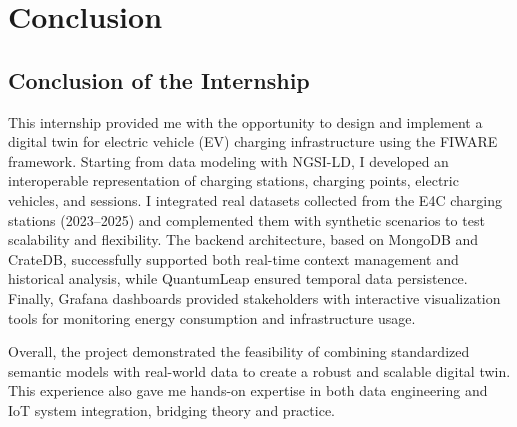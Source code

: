 \chapter{Conclusion}\label{chap7}
\section{Conclusion of the Internship}
This internship provided me with the opportunity to design and implement a digital twin for electric vehicle (EV) charging infrastructure using the FIWARE framework.  
Starting from data modeling with NGSI-LD, I developed an interoperable representation of charging stations, charging points, electric vehicles, and sessions.  
I integrated real datasets collected from the E4C charging stations (2023–2025) and complemented them with synthetic scenarios to test scalability and flexibility.  
The backend architecture, based on MongoDB and CrateDB, successfully supported both real-time context management and historical analysis, while QuantumLeap ensured temporal data persistence.  
Finally, Grafana dashboards provided stakeholders with interactive visualization tools for monitoring energy consumption and infrastructure usage.  

Overall, the project demonstrated the feasibility of combining standardized semantic models with real-world data to create a robust and scalable digital twin.  
This experience also gave me hands-on expertise in both data engineering and IoT system integration, bridging theory and practice.

